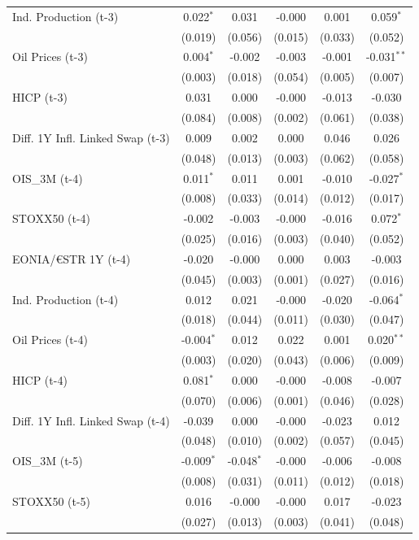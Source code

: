 \begin{longtable}[t]{lccccc}
Ind. Production (t-3) & 0.022$^{*}$ & 0.031 & -0.000 & 0.001 & 0.059$^{*}$\\
 & (0.019) & (0.056) & (0.015) & (0.033) & (0.052)\\
Oil Prices (t-3) & 0.004$^{*}$ & -0.002 & -0.003 & -0.001 & -0.031$^{**}$\\
 & (0.003) & (0.018) & (0.054) & (0.005) & (0.007)\\
HICP (t-3) & 0.031 & 0.000 & -0.000 & -0.013 & -0.030\\
 & (0.084) & (0.008) & (0.002) & (0.061) & (0.038)\\
Diff. 1Y Infl. Linked Swap (t-3) & 0.009 & 0.002 & 0.000 & 0.046 & 0.026\\
 & (0.048) & (0.013) & (0.003) & (0.062) & (0.058)\\
OIS\_3M (t-4) & 0.011$^{*}$ & 0.011 & 0.001 & -0.010 & -0.027$^{*}$\\
 & (0.008) & (0.033) & (0.014) & (0.012) & (0.017)\\
STOXX50 (t-4) & -0.002 & -0.003 & -0.000 & -0.016 & 0.072$^{*}$\\
 & (0.025) & (0.016) & (0.003) & (0.040) & (0.052)\\
EONIA/€STR 1Y (t-4) & -0.020 & -0.000 & 0.000 & 0.003 & -0.003\\
 & (0.045) & (0.003) & (0.001) & (0.027) & (0.016)\\
Ind. Production (t-4) & 0.012 & 0.021 & -0.000 & -0.020 & -0.064$^{*}$\\
 & (0.018) & (0.044) & (0.011) & (0.030) & (0.047)\\
Oil Prices (t-4) & -0.004$^{*}$ & 0.012 & 0.022 & 0.001 & 0.020$^{**}$\\
 & (0.003) & (0.020) & (0.043) & (0.006) & (0.009)\\
HICP (t-4) & 0.081$^{*}$ & 0.000 & -0.000 & -0.008 & -0.007\\
 & (0.070) & (0.006) & (0.001) & (0.046) & (0.028)\\
Diff. 1Y Infl. Linked Swap (t-4) & -0.039 & 0.000 & -0.000 & -0.023 & 0.012\\
 & (0.048) & (0.010) & (0.002) & (0.057) & (0.045)\\
OIS\_3M (t-5) & -0.009$^{*}$ & -0.048$^{*}$ & -0.000 & -0.006 & -0.008\\
 & (0.008) & (0.031) & (0.011) & (0.012) & (0.018)\\
STOXX50 (t-5) & 0.016 & -0.000 & -0.000 & 0.017 & -0.023\\
 & (0.027) & (0.013) & (0.003) & (0.041) & (0.048)\\

\end{longtable}
